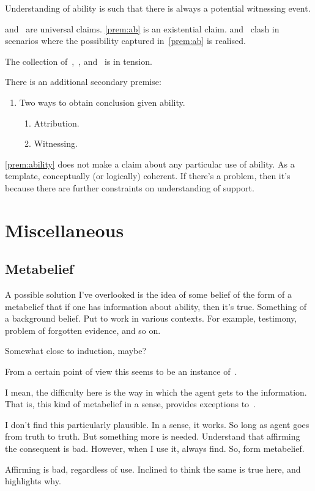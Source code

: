 Understanding of ability is such that there is always a potential witnessing event.

\uRa{} and~\nI{} are universal claims.
\ref{prem:ab} is an existential claim.
\uRa{} and~\nI{} clash in scenarios where the possibility captured in~\ref{prem:ab} is realised.

The collection of~\uRa{},~\nI{}, and~\eA{} is in tension.

There is an additional secondary premise:

\begin{note}
\begin{enumerate}
\item\label{prem:ability} Two ways to obtain conclusion given ability.
  \begin{enumerate}
  \item Attribution.
  \item Witnessing.
  \end{enumerate}
\end{enumerate}

\ref{prem:ability} does not make a claim about any particular use of ability.
As a template, conceptually (or logically) coherent.
If there's a problem, then it's because there are further constraints on understanding of support.
\end{note}

\section{Miscellaneous}
\label{sec:misc}

\subsection{Metabelief}
\label{sec:metabelief}

\begin{note}[Idea]
  A possible solution I've overlooked is the idea of some belief of the form of a metabelief that if one has information about ability, then it's true.
  Something of a background belief.
  Put to work in various contexts.
  For example, testimony, problem of forgotten evidence, and so on.

  Somewhat close to induction, maybe?
\end{note}

\begin{note}[Reduction?]
  From a certain point of view this seems to be an instance of~\nI{}.

  I mean, the difficulty here is the way in which the agent gets to the information.
  That is, this kind of metabelief in a sense, provides exceptions to~\nI{}.

  I don't find this particularly plausible.
  In a sense, it works.
  So long as agent goes from truth to truth.
  But something more is needed.
  Understand that affirming the consequent is bad.
  However, when I use it, always find.
  So, form metabelief.

  Affirming is bad, regardless of use.
  Inclined to think the same is true here, and~\nI{} highlights why.
\end{note}

